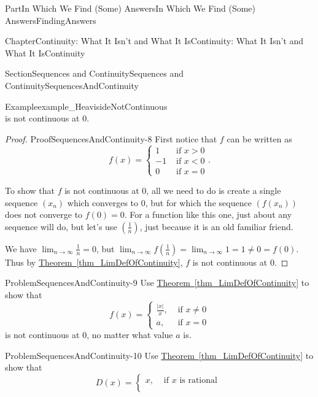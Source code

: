 \documentclass[oneside,10pt,]{book}
\newcommand{\xreffont}{\relax}
\numberwithin{equation}{part}
\newcommand{\abs}[1]{\left|#1\right|}
\newcommand{\lt}{<}
\newcommand{\amp}{&}
\begin{document}
\begin{partptx}{Part}{In Which We Find (Some) Answers}{}{In Which We Find (Some) Answers}{}{}{FindingAnswers}
\begin{chapterptx}{Chapter}{Continuity: What It Isn't and What It Is}{}{Continuity: What It Isn't and What It Is}{}{}{Continuity}
\begin{sectionptx}{Section}{Sequences and Continuity}{}{Sequences and Continuity}{}{}{SequencesAndContinuity}
\begin{example}{Example}{}{example_HeavisideNotContinuous}
\begin{equation*}
\end{equation*}
is not continuous at \(0\).%
\end{example}
\begin{proof}{Proof}{}{SequencesAndContinuity-8}
First notice that \(f\) can be written as%
\begin{equation*}
f(x)= \begin{cases}1\amp \text{ if } x>0\\ -1\amp \text{ if } x\lt 0\\ 0\amp \text{ if } x=0 \end{cases} \text{.}
\end{equation*}
%
\par
To show that \(f\) is not continuous at \(0\), all we need to do is create a single sequence \(\left(x_n\right)\) which converges to \(0\), but for which the sequence \(\left(f\left(x_n\right)\right)\) does not converge to \(f(0)=0\).  For a function like this one, just about any sequence will do, but let's use \(\left(\frac{1}{n}\right)\), just because it is an old familiar friend.%
\par
We have \(\displaystyle\lim_{n\rightarrow\infty}\frac{1}{n}=0\), but \(\displaystyle\lim_{n\rightarrow\infty}f\left(\frac{1}{n}\right)=\lim_{n\rightarrow
\infty}1=1\neq 0=f(0)\).  Thus by \hyperref[thm_LimDefOfContinuity]{Theorem~{\xreffont\ref{thm_LimDefOfContinuity}}}, \(f\) is not continuous at \(0\).%
\end{proof}
\begin{problem}{Problem}{}{SequencesAndContinuity-9}%
 Use \hyperref[thm_LimDefOfContinuity]{Theorem~{\xreffont\ref{thm_LimDefOfContinuity}}} to show that%
\begin{equation*}
f(x)= \begin{cases}
\frac{\abs{x}}{x},\amp \text{ if } x\neq 0\\
a, \amp \text{ if } x=0 \end{cases}  
\end{equation*}
is not continuous at \(0\), no matter what value \(a\) is.%
\end{problem}
\begin{problem}{Problem}{}{SequencesAndContinuity-10}%
Use \hyperref[thm_LimDefOfContinuity]{Theorem~{\xreffont\ref{thm_LimDefOfContinuity}}} to show that%
\begin{equation*}
D(x)= \begin{cases}
x, \amp \text{ if } x\text{ is rational } \\

\end{cases}
\end{equation*}
\end{problem}
\end{sectionptx}
\end{chapterptx}
\end{partptx}
\end{document}
